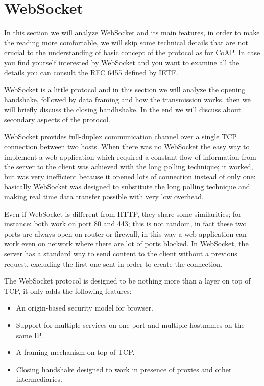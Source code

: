 \chapter{WebSocket}\label{ch:ws}
In this section we will analyze WebSocket and its main features, in order to make the reading more comfortable,
we will skip some technical details that are not crucial to the understanding of basic concept of the protocol as for CoAP.\newline
In case you find yourself interested by WebSocket and you want to examine all the details you can consult the RFC 6455 defined by IETF\cite{rfcws}. \newline

WebSocket is a little protocol and in this section we will analyze the opening handshake, followed by data framing and how the transmission works, then we will briefly discuss the closing handhshake.\newline
In the end we will discuss about secondary aspects of the protocol.\newline

WebSocket provides full-duplex communication channel over a single TCP connection between two hosts.\newline
When there was no WebSocket the easy way to implement a web application which required a constant flow of information from
the server to the client was achieved with the long polling technique; it worked, but was very inefficient because it opened
lots of connection instead of only one; basically WebSocket was designed to substitute the long polling technique and making real time data transfer 
possible with very low overhead.\newline

Even if WebSocket is different from HTTP, they share some similarities; for instance: both work on port 80 and 443; this is not random, in fact these two ports
are always open on router or firewall, in this way a web application can work even on network where there are lot of ports blocked.\newline
In WebSocket, the server has a standard way to send content to the client without a previous request, excluding the first one sent in order to create the connection.\newline

The WebSocket protocol is designed to be nothing more than a layer on top of TCP, it only adds the following features:
\begin{itemize}
	\item An origin-based security model for browser.
	\item Support for multiple services on one port and multiple hostnames on the same IP.
	\item A framing mechanism on top of TCP.
	\item Closing handshake designed to work in presence of proxies and other intermediaries.
\end{itemize}

